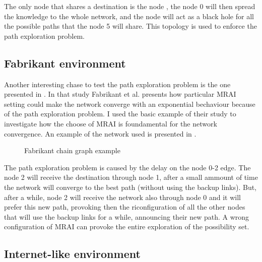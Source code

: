 The only node that shares a destination is the node , the node
\num{0} will then spread the knowledge to the whole network, and the node 
 will act as a black hole for all the possible paths
that the node \num{5} will share.
This topology is used to enforce the path exploration problem.

\subsection{Fabrikant environment}
\label{subsec:fabrikant_env}

Another interesting chase to test the path exploration problem is the one
presented in \cite{fabrikant2011there}.
In that study Fabrikant et al. presents how particular \ac{MRAI} setting could 
make the network converge with an exponential bechaviour because of the path
exploration problem.
I used the basic example of their study to investigate how the choose of \ac{MRAI}
is foundamental for the network convergence.
An example of the network used is presented 
in .

\begin{figure}[h]                                                               
    \begin{center}                                                              
        
    \end{center}                                                                
    \caption{Fabrikant chain graph example}                                
    \label{fig:fabrikant_graph}
\end{figure}

The path exploration problem is caused by the delay on the node \num{0}-\num{2}
edge. The node 2 will receive the destination through node 1, after a small ammount
of time the network will converge to the best path (without using the backup links).
But, after a while, node \num{2} will receive the network also through node \num{0}
and it will prefer this new path, provoking then the riconfiguration of all
the other nodes that will use the backup links for a while, announcing their 
new path.
A wrong configuration of \ac{MRAI} can provoke the entire exploration of the 
possibility set.

\subsection{Internet-like environment}
\label{subsec:internet_like_env}

